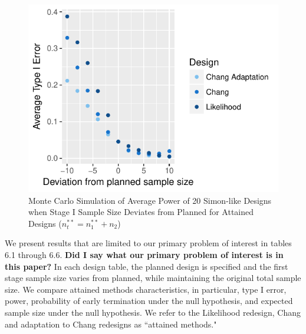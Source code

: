 \documentclass[12pt]{report}\usepackage[]{graphicx}\usepackage[]{color}
\newlength{\li}\setlength{\li}{14.48pt}
\begin{document}
\begin{figure}[]
\caption{Monte Carlo Simulation of Average Power of 20 Simon-like Designs when Stage I Sample Size Deviates from Planned for Attained Designs ($n_t^{\ast\ast} = n_1^{\ast\ast} + n_2$)}
\centering
\begin{Schunk}


\centerline{\includegraphics{unnamed-chunk-6-1} }

\end{Schunk}
\end{figure}
\indent We present results that are limited to our primary problem of interest in tables 6.1 through 6.6. \textbf{Did I say what our primary problem of interest is in this paper?} In each design table, the planned design is specified and the first stage sample size varies from planned, while maintaining the original total sample size. We compare attained methods characteristics, in particular, type I error, power, probability of early termination under the null hypothesis, and expected sample size under the null hypothesis. We refer to the Likelihood redesign, Chang and adaptation to Chang redesigns as ``attained methods." \\
\end{document}
